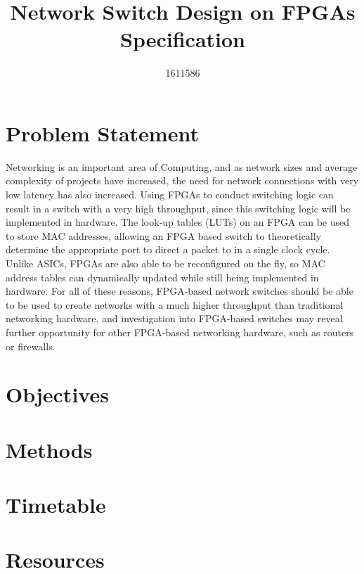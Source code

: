 \documentclass[12pt, a4paper, twoside]{IEEEtran}
\title{Network Switch Design on FPGAs \\ \Large{Specification}}
\author{1611586}
\begin{document}
\maketitle


\section{Problem Statement}
\label{problem_statement}
Networking is an important area of Computing, and as network sizes and average complexity of projects have increased,
the need for network connections with very low latency has also increased.
Using FPGAs to conduct switching logic can result in a switch with a very high throughput, since this switching logic will be implemented in hardware. The look-up tables (LUTs) on an FPGA can be used to store MAC addresses, allowing an FPGA based switch to theoretically determine the appropriate port to direct a packet to in a single clock cycle. Unlike ASICs, FPGAs are also able to be reconfigured on the fly, so MAC address tables can dynamically updated while still being implemented in hardware.
For all of these reasons, FPGA-based network switches should be able to be used to create networks with a much higher throughput than traditional networking hardware, and investigation into FPGA-based switches may reveal further opportunity for other FPGA-based networking hardware, such as routers or firewalls.

\section{Objectives}
\label{objectives}
\section{Methods}
\label{methods}

\section{Timetable}
\label{timetable}

\section{Resources}
\label{resources}





\end{document}
